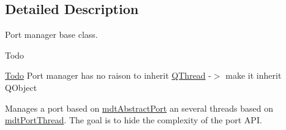 \subsection{Detailed Description}
Port manager base class. 

\begin{DoxyRefDesc}{Todo}
\item[\hyperlink{todo__todo000029}{Todo}]Port manager has no raison to inherit \hyperlink{class_q_thread}{Q\-Thread} -\/$>$ make it inherit Q\-Object \end{DoxyRefDesc}


Manages a port based on \hyperlink{classmdt_abstract_port}{mdt\-Abstract\-Port} an several threads based on \hyperlink{classmdt_port_thread}{mdt\-Port\-Thread}. The goal is to hide the complexity of the port A\-P\-I.

